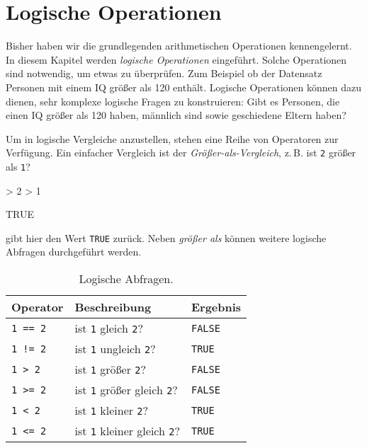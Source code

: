 
\section{Logische Operationen} \label{sec:logische_operationen}                            

Bisher haben wir die grundlegenden arithmetischen Operationen kennengelernt. In diesem Kapitel werden \emph{logische Operationen} eingeführt. Solche Operationen sind notwendig, um etwas zu überprüfen. Zum Beispiel ob der Datensatz Personen mit einem IQ größer als 120 enthält. Logische Operationen können dazu dienen, sehr komplexe logische Fragen zu konstruieren: Gibt es Personen, die einen IQ größer als 120 haben, männlich sind sowie geschiedene Eltern haben? 
               
Um in \R{} logische Vergleiche anzustellen, stehen eine Reihe von Operatoren zur Verfügung. Ein einfacher Vergleich ist der \emph{Größer-als-Vergleich}, z.\,B. ist \verb!2! größer als \verb!1!?

\begin{Schunk}
\begin{Sinput}
> 2 > 1
\end{Sinput}
\begin{Soutput}
[1] TRUE
\end{Soutput}
\end{Schunk}
 
\R{} gibt hier den Wert \verb!TRUE! zurück. Neben \emph{größer als} können weitere logische Abfragen durchgeführt werden.

\begin{table}[h]
  \centering
  \caption{Logische Abfragen.}
  \label{tab:logische_abfragen}
\begin{small}
\begin{tabular}{lll}
\hline
Operator & Beschreibung  & Ergebnis    \tabularnewline
\hline
\verb!1 == 2!	& ist \verb!1! gleich \verb!2!?   & \verb!FALSE!     \tabularnewline
\texttt{1 != 2}	& ist \verb!1! ungleich \verb!2!? & \verb!TRUE!         \tabularnewline
\verb!1 > 2!	&  ist \verb!1! größer \verb!2!?  & \verb!FALSE!  \tabularnewline
\verb!1 >= 2!	&  ist \verb!1! größer gleich \verb!2!? &  \verb!FALSE!             \tabularnewline
\verb!1 < 2!	&  ist \verb!1! kleiner \verb!2!? &  \verb!TRUE!         \tabularnewline
\verb!1 <= 2!	&  ist \verb!1! kleiner gleich \verb!2!? & \verb!TRUE!   \tabularnewline
\hline
\end{tabular}
\end{small}
\end{table}

